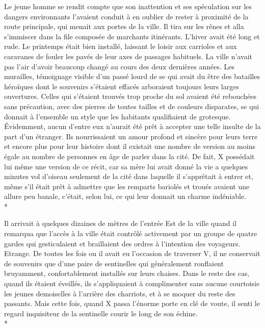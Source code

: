 \documentclass{book}
\begin{document}
Le jeune homme se rendit compte que son inattention et ses spéculation sur les dangers environnants l'avaient conduit à en oublier de rester à proximité de la route principale, qui menait aux portes de la ville. Il tira sur les rênes et alla s'immiscer dans la file composée de marchants itinérants. L'hiver avait été long et rude. Le printemps était bien installé, laissant le loisir aux carrioles et aux caravanes de fouler les pavés de leur axes de passages habituels.
La ville n'avait pas l'air d'avoir beaucoup changé au cours des deux dernières années. Les murailles, témoignage visible d'un passé lourd de se qui avait du être des batailles héroïques dont le souvenirs s'étaient effacés arboraient toujours leurs larges ouvertures. Celles qui s'étaient trouvés trop proche du sol avaient été rebouchées sans précaution, avec des pierres de toutes tailles et de couleurs disparates, se qui donnait à l'ensemble un style que les habitants qualifiaient de grotesque. Évidemment, aucun d'entre eux n'aurait été prêt à accepter une telle insulte de la part d'un étranger. Ils nourrissaient un amour profond et sincère pour leurs terre et encore plus pour leur histoire dont il existait une nombre de version au moins égale au nombre de personnes en âge de parler dans la cité. De fait, X possédait lui même une version de ce récit, car sa mère lui avait donné la vie a quelques minutes vol d'oiseau seulement de la cité dans laquelle il s’apprêtait à entrer et, même s'il était prêt à admettre que les remparts bariolés et troués avaient une allure peu banale, c'était, selon lui, ce qui leur donnait un charme indéniable. \\*

Il arrivait à quelques dizaines de mètres de l'entrée Est de la ville quand il remarqua que l'accès à la ville était contrôlé activement par un groupe de quatre gardes qui gesticulaient et braillaient des ordres à l'intention des voyageurs.
Etrange. De toutes les fois ou il avait eu l'occasion de traverser V, il ne conservait de souvenirs que d'une paire de sentinelles qui généralement ronflaient bruyamment, confortablement installés sur leurs chaises. Dans le reste des cas, quand ils étaient éveillés, ils s'appliquaient à complimenter sans aucune courtoisie les jeunes demoiselles à l'arrière des charriots, et à se moquer du reste des passants. 
Mais cette fois, quand X passa l'énorme porte en clé de voute, il senti le regard inquisiteur de la sentinelle courir le long de son échine. \\*
\end{document}
